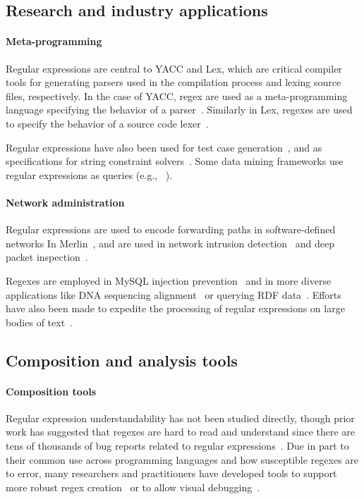 \subsection{Research and industry applications}
\paragraph{Meta-programming}  Regular expressions are central to YACC and Lex, which are critical compiler tools for generating parsers used in the compilation process and lexing source files, respectively.  In the case of YACC, regex are used as a meta-programming language specifying the behavior of a parser~\citep{YACCManual}.  Similarly in Lex, regexes are used to specify the behavior of a source code lexer~\citep{LexManual}.


Regular expressions have also been used for test case generation~\cite{Ghosh:2013:JAT:2486788.2486925, Galler:2014:STD:2683035.2683100, Anand:2013:OSM:2503903.2503991, Tillmann:2014:TAT:2642937.2642941},  and as specifications for string constraint solvers~\cite{Trinh:2014:SSS:2660267.2660372, hampi}.  Some data mining frameworks use regular expressions as queries (e.g., ~\cite{Begel:2010:CDE:1806799.1806821}).

\paragraph{Network administration} Regular expressions are used to encode forwarding paths in software-defined networks In Merlin~\cite{Soule:2014:MLP:2674005.2674989}, and are used in network intrusion detection~\cite{network,Sommer:2003:EBN:948109.948145} and deep packet inspection~\cite{Kumar:2006:AAM:1151659.1159952,Yu:2006:FMR:1185347.1185360}.


Regexes are employed in MySQL injection prevention~\cite{Yeole:2011:ADT:1980022.1980229} and in more diverse applications like DNA sequencing alignment~\cite{1594922} or querying RDF data~\cite{Lee:2010:PSQ:1871871.1871877, Alkhateeb:2009:ESR:1540656.1540975}.  Efforts have also been made to expedite the processing of regular expressions on large bodies of text~\cite{Baeza-Yates:1996:FTS:235809.235810}.

\subsection{Composition and analysis tools}

\paragraph{Composition tools} Regular expression understandability has not been studied directly, though prior work has suggested that regexes are hard to read and understand since there are tens of thousands of bug reports related to regular expressions~\cite{Spishak:2012:TSR:2318202.2318207}.  Due in part to their common use across programming languages and how susceptible regexes are to error, many researchers and practitioners have developed tools to support more robust regex creation~\cite{Spishak:2012:TSR:2318202.2318207} or to allow visual debugging~\cite{Beck:2014:RVD:2591062.2591111}.


